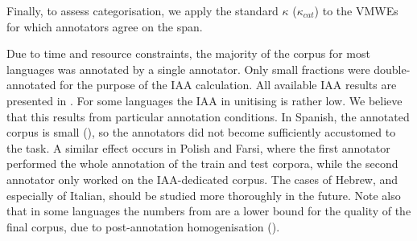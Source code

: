 \documentclass[output=paper,
modfonts,
]{langscibook}
\begin{document}



Finally, to assess categorisation, we apply the standard $\kappa$ ($\kappa_{cat}$) to the VMWEs for which annotators agree on the span. 

Due to time and resource constraints, the majority of the corpus for most languages was annotated by a single annotator. %
Only small fractions were double-annotated for the purpose of the IAA calculation. 
All available IAA results are presented in .
For some languages the IAA in unitising is rather low. We believe that this results from particular annotation conditions. In Spanish, the annotated corpus is small (), %
so the annotators did not become sufficiently accustomed to the task. A similar effect occurs in Polish and Farsi, where the first annotator performed the whole annotation of the train and test corpora, while the second annotator only worked on the IAA-dedicated corpus. The cases of Hebrew, and especially of Italian, should be studied more thoroughly in the future. Note also that in some languages the numbers from  are a lower bound for the quality of the final corpus, due to post-annotation homogenisation  (). 
\end{document}
